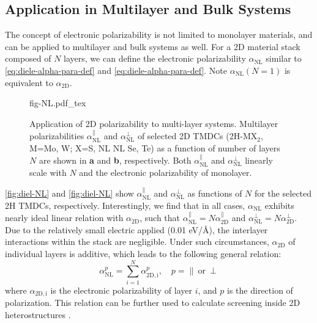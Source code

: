 \subsection{Application in Multilayer and Bulk Systems}
\label{sec:diel-apply-electr-polar}
The concept of electronic polarizability is not limited to monolayer
materials, and can be applied to multilayer and bulk systems as
well. For a 2D material stack composed of $N$ layers, we can define
the electronic polarizability $\alpha_{\mathrm{NL}}$ similar to
 \eqref{eq:diele-alpha-para-def} and \eqref{eq:diele-alpha-para-def}. Note
 $\alpha_{\mathrm{NL}}(N=1)$ is equivalent to $\alpha_{\mathrm{2D}}$.
 \begin{figure}[!htbp]
\centering
{fig-NL.pdf_tex}
\caption{\label{fig:diel-NL} %
  Application of 2D polarizability to multi-layer systems.  Multilayer
  polarizabilities $\alpha_{\mathrm{NL}}^{\parallel}$ and
  $\alpha_{\mathrm{NL}}^{\perp}$ of selected 2D TMDCs (2H-MX$_{2}$,
  M=Mo, W; X=S, NL NL Se, Te) as a function of number of layers $N$
  are shown in \textbf{a} and \textbf{b}, respectively.  Both
  $\alpha_{\mathrm{NL}}^{\parallel}$ and
  $\alpha_{\mathrm{NL}}^{\perp}$ linearly scale with $N$ and the
  electronic polarizability of monolayer.}
\end{figure}
%
 \autoref{fig:diel-NL} and \autoref{fig:diel-NL} show
$\alpha_{\mathrm{NL}}^{\parallel}$ and $\alpha_{\mathrm{NL}}^{\perp}$
as functions of $N$ for the selected 2H TMDCs,
respectively. Interestingly, we find that in all cases,
$\alpha_{\mathrm{NL}}$ exhibits nearly ideal linear relation with
$\alpha_{\mathrm{2D}}$, such that
$\alpha_{\mathrm{NL}}^{\parallel}= N \alpha_{\mathrm{2D}}^{\parallel}$
and $\alpha_{\mathrm{NL}}^{\perp}= N
\alpha_{\mathrm{2D}}^{\perp}$. Due to the relatively small
electric applied (0.01 eV/\AA{}), the interlayer interactions within
the stack are negligible. Under such circumstances, $\alpha_{\mathrm{2D}}$ of individual layers is additive, which leads to the following general relation:
\begin{equation}
  \label{eq:diele-alpha-nl}
  \alpha_{\mathrm{NL}}^{p} = \sum_{i=1}^{N} \alpha_{\mathrm{2D, i}}^{p},\quad p=\parallel\ \mathrm{or}\ \perp
\end{equation}
where $\alpha_{\mathrm{2D, i}}$ is the electronic polarizability of
layer $i$, and $p$ is the direction of polarization. This relation can
be further used to calculate screening inside 2D heterostructures
\cite{Kumar_2016_jpcc,Andersen_2015_dielec_vdWH}.
%
%
%

